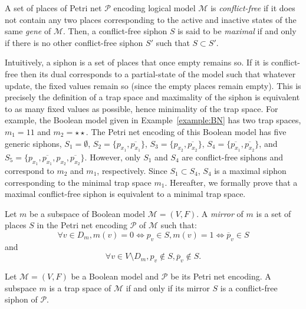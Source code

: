 \documentclass[runningheads]{llncs}
\begin{document}
\begin{definition}

  A set of places of Petri net \(\mathcal{P}\) encoding logical model \(\mathcal{M}\) is \emph{conflict-free} if it does not contain any two places corresponding to the active and inactive states of the same \emph{gene} of \(\mathcal{M}\). Then, a conflict-free siphon \(S\) is said to be \emph{maximal} if and only if there is no other conflict-free siphon \(S'\) such that \(S \subset S'\).

\end{definition}

Intuitively, a siphon is a set of places that once empty remains so.
If it is conflict-free then its dual corresponds to a partial-state of the model such that whatever update, the fixed values remain so (since the empty places remain empty).
This is precisely the definition of a trap space and maximality of the siphon is equivalent to as many fixed values as possible, hence minimality of the trap space.
For example, the Boolean model given in Example~\ref{example:BN} has two trap spaces, \(m_1 = 11\) and \(m_2 = \star\star\).
The Petri net encoding of this Boolean model has five generic siphons, \(S_1 = \emptyset\), \(S_2 = \{p_{x_1}, \overline{p_{x_1}}\}\), \(S_3 = \{p_{x_2}, \overline{p_{x_2}}\}\), \(S_4 = \{\overline{p_{x_1}}, \overline{p_{x_2}}\}\), and \(S_5 = \{p_{x_1}, \overline{p_{x_1}}, p_{x_2}, \overline{p_{x_2}}\}\).
However, only \(S_1\) and \(S_4\) are conflict-free siphons and correspond to \(m_2\) and \(m_1\), respectively.
Since \(S_1 \subset S_4\), \(S_4\) is a maximal siphon corresponding to the minimal trap space \(m_1\).
Hereafter, we formally prove that a maximal conflict-free siphon is equivalent to a minimal trap space.

\begin{definition}

  Let \(m\) be a subspace of Boolean model \(\mathcal{M} = (V, F)\). A \emph{mirror} of $m$ is a set of places $S$ in the Petri net encoding \(\mathcal{P}\) of \(\mathcal{M}\) such that:
  \[\forall v \in D_m, m(v) = 0 \Leftrightarrow p_v \in S, m(v) = 1 \Leftrightarrow \overline{p}_v \in S\] and \[\forall v \in V \setminus D_m, p_v \not \in S, \overline{p}_v \not \in S.\]

\end{definition}

\begin{theorem}%
\label{theo:ts_2_sp}

  Let \(\mathcal{M} = (V, F)\) be a Boolean model and \(\mathcal{P}\) be its Petri net encoding. A subspace \(m\) is a trap space of \(\mathcal{M}\) if and only if its mirror \(S\) is a conflict-free siphon of \(\mathcal{P}\).

\end{theorem}
\end{document}
